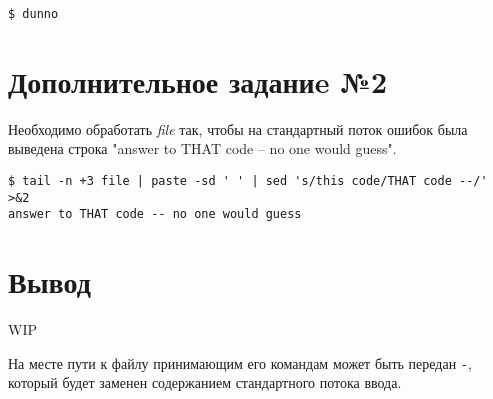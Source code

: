 \documentclass[listings]{labreport}
\begin{document}
\begin{verbatim}
$ dunno
\end{verbatim}

\section*{Дополнительное заданиe №2}

Необходимо обработать \textit{file} так, чтобы на стандартный поток ошибок была выведена строка "answer to THAT code -- no one would guess".

\begin{verbatim}
$ tail -n +3 file | paste -sd ' ' | sed 's/this code/THAT code --/' >&2
answer to THAT code -- no one would guess
\end{verbatim}

\section*{Вывод}

WIP

На месте пути к файлу принимающим его командам может быть передан \texttt{-}, который будет заменен
содержанием стандартного потока ввода.
\end{document}
